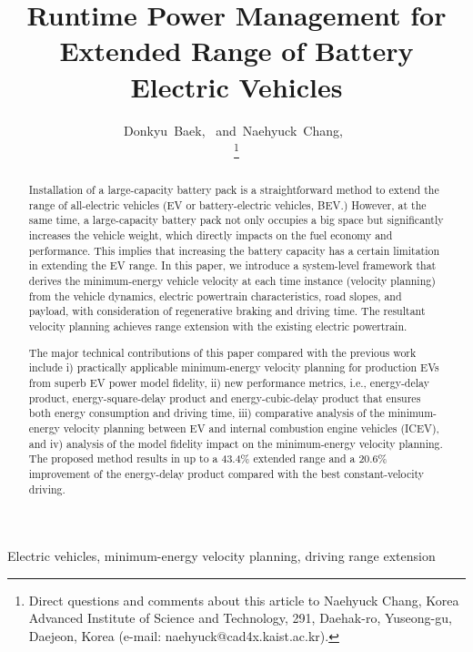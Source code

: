 \documentclass{IEEEtran}
\begin{document}
\title{Runtime Power Management for Extended Range of Battery Electric Vehicles}

\author{
Donkyu~Baek,~ 
and~Naehyuck~Chang,~

\thanks{Direct questions and comments about this article to Naehyuck Chang, Korea Advanced Institute of Science and Technology, 291, Daehak-ro, Yuseong-gu, Daejeon, Korea (e-mail: naehyuck@cad4x.kaist.ac.kr).}
}

\maketitle

\begin{abstract}
Installation of a large-capacity battery pack is a straightforward method to extend the range of all-electric vehicles (EV or battery-electric vehicles, BEV.) However, at the same time, a large-capacity battery pack not only occupies a big space but significantly increases the vehicle weight, which directly impacts on the  fuel economy and performance. This implies that increasing the battery capacity has a certain limitation in extending the EV range. In this paper, we introduce a system-level framework that derives the minimum-energy vehicle velocity at each time instance (velocity planning) from the vehicle dynamics, electric powertrain characteristics, road slopes, and payload, with consideration of regenerative braking and driving time. The resultant velocity planning achieves range extension with the existing electric powertrain. 

The major technical contributions of this paper compared with the previous work include i) practically applicable minimum-energy velocity planning for production EVs from superb EV power model fidelity, ii) new performance metrics, i.e., energy-delay product, energy-square-delay product and energy-cubic-delay product that ensures both energy consumption and driving time, iii) comparative analysis of the minimum-energy velocity planning between EV and internal combustion engine vehicles (ICEV), and iv) analysis of the model fidelity impact on the minimum-energy velocity planning. The proposed method results in up to a 43.4\% extended range and a 20.6\% improvement of the energy-delay product compared with the best constant-velocity driving.
\end{abstract}

\begin{IEEEkeywords}
Electric vehicles, minimum-energy velocity planning, driving range extension
\end{IEEEkeywords}
\end{document}
